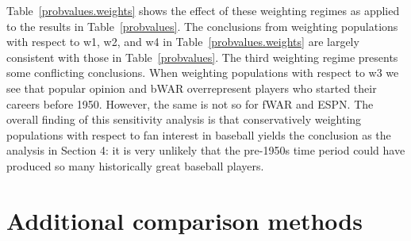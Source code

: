 \documentclass[11pt]{article}\usepackage[]{graphicx}\usepackage[]{color}
\begin{document}
Table~\ref{probvalues.weights} shows the effect of these weighting regimes as 
applied to the results in Table~\ref{probvalues}.  
The conclusions from weighting populations with respect to w1, w2, and w4 in 
Table~\ref{probvalues.weights} are largely consistent with those in 
Table~\ref{probvalues}.  %
The third weighting regime presents some conflicting conclusions.  When 
weighting populations with respect to w3 we see that popular opinion and 
bWAR overrepresent players who started their careers before 1950.  
However, the same is not so for fWAR and ESPN. 
The overall finding of this sensitivity analysis is that conservatively 
weighting populations with respect to fan interest in baseball yields the 
conclusion as the analysis in Section 4:
it is very unlikely that the pre-1950s time period could 
have produced so many historically great baseball players.  





\section{Additional comparison methods}

\end{document}
